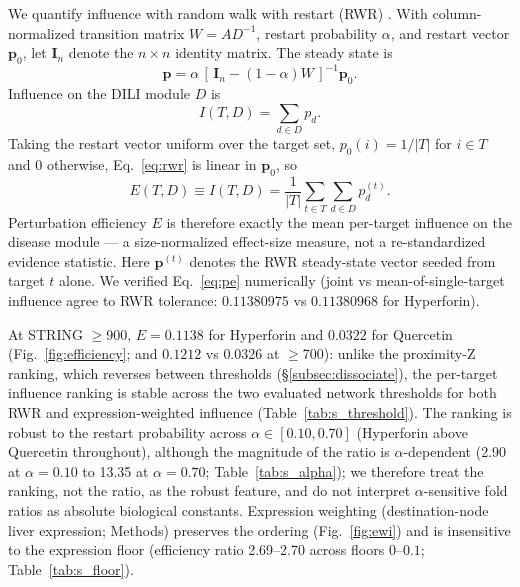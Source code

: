 We quantify influence with random walk with restart (RWR) \citep{Kohler2008, Cowen2017}. With column-normalized transition matrix $W = AD^{-1}$, restart probability $\alpha$, and restart vector $\mathbf{p}_0$, let $\mathbf{I}_n$ denote the $n \times n$ identity matrix. The steady state is
\begin{equation}
\mathbf{p} = \alpha\,[\,\mathbf{I}_n - (1-\alpha)W\,]^{-1}\mathbf{p}_0. \label{eq:rwr}
\end{equation}
Influence on the DILI module $D$ is
\begin{equation}
I(T,D) = \sum_{d \in D} p_d. \label{eq:infl}
\end{equation}
Taking the restart vector uniform over the target set, $p_0(i) = 1/|T|$ for $i \in T$ and $0$ otherwise, Eq.~\eqref{eq:rwr} is linear in $\mathbf{p}_0$, so
\begin{equation}
E(T,D) \equiv I(T,D) = \frac{1}{|T|}\sum_{t \in T}\sum_{d \in D} p_d^{(t)}. \label{eq:pe}
\end{equation}
Perturbation efficiency $E$ is therefore exactly the mean per-target influence on the disease module --- a size-normalized effect-size measure, not a re-standardized evidence statistic. Here $\mathbf{p}^{(t)}$ denotes the RWR steady-state vector seeded from target $t$ alone. We verified Eq.~\eqref{eq:pe} numerically (joint vs mean-of-single-target influence agree to RWR tolerance: $0.11380975$ vs $0.11380968$ for Hyperforin).

At STRING $\geq$900, $E = 0.1138$ for Hyperforin and $0.0322$ for Quercetin (Fig.~\ref{fig:efficiency}; and $0.1212$ vs $0.0326$ at $\geq$700): unlike the proximity-Z ranking, which reverses between thresholds (\S\ref{subsec:dissociate}), the per-target influence ranking is stable across the two evaluated network thresholds for both RWR and expression-weighted influence (Table~\ref{tab:s_threshold}). The ranking is robust to the restart probability across $\alpha \in [0.10, 0.70]$ (Hyperforin above Quercetin throughout), although the magnitude of the ratio is $\alpha$-dependent (2.90 at $\alpha=0.10$ to 13.35 at $\alpha=0.70$; Table~\ref{tab:s_alpha}); we therefore treat the ranking, not the ratio, as the robust feature, and do not interpret $\alpha$-sensitive fold ratios as absolute biological constants. Expression weighting (destination-node liver expression; Methods) preserves the ordering (Fig.~\ref{fig:ewi}) and is insensitive to the expression floor (efficiency ratio 2.69--2.70 across floors $0$--$0.1$; Table~\ref{tab:s_floor}).


